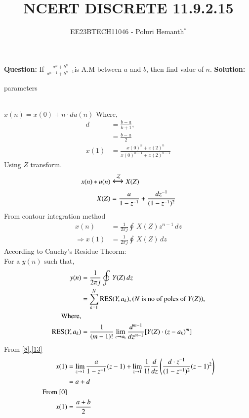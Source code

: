 \documentclass[journal,12pt,twocolumn]{IEEEtran}
\theoremstyle{remark}
\begin{document}

\vspace{3cm}


\title{NCERT DISCRETE 11.9.2.15}
\author{EE23BTECH11046 - Poluri Hemanth$^{*}$}
\maketitle
\textbf{Question:}
If \( \frac{a^n +b^n}{a^{n-1} + b^{n-1}}\)is A.M between $a$ and $b$, then find value of $n$.
\break
\textbf{Solution:}
\begin{table}[h!]
        
        \caption{parameters}
\end{table}
\\$x(n)=x(0)+n\cdot du(n)$    Where,
\begin{align}
	d&=\frac{b-a}{k+1},\\
	 &=\frac{b-a}{2}\label{0}\\
	x(1)&=\frac{x(0)^n +x(2)^n}{x(0)^{n-1} + x(2)^{n-1}}\label{r} 
\end{align}
Using $Z$ transform.
\begin{align}
	x(n)*u(n)&\Large\xleftrightarrow{\mathcal{Z}}X(Z)\\
	X(Z)&=\frac{a}{1-z^{-1}}+\frac{dz^{-1}}{(1-z^{-1})^2}\label{8}\\
\end{align}
From contour integration method
\begin{align}
	x(n)&=\frac{1}{2\pi j}\oint\,X(Z)z^{n-1}\,dz\\
	\Rightarrow x(1)&=\frac{1}{2\pi j}\oint\,X(Z)\,dz
\end{align}
According to Cauchy's Residue Theorm:\\
For a $y(n)$ such that, \\
\begin{align}
	y(n)&=\frac{1}{2\pi j}\oint\,Y(Z)\,dz\\
	&=\sum\limits_{k=1}^N\text{RES}(Y,a_k),\text{($N$ is no of poles of $Y(Z)$)},\label{13}\\ 
	\notag\text{Where,}\\
	\text{RES}(Y,a_k)&=\frac{1}{(m-1)!}\lim_{z\to a_k}\frac{d^{m-1}}{dz^{m-1}}[Y(Z)\cdot(z-a_k)^{m}]
\end{align}
From \eqref{8},\eqref{13}
\begin{align}	
	x(1)&=\lim_{z\to1}\frac{a}{1-z^{-1}}(z-1)+\lim_{z\to1}\frac{1}{1!}\frac{d}{dz}\left(\frac{d\cdot z^{-1}}{(1-z^{-1})^2}(z-1)^2\right)\\
	&=a+d\\
	\notag\text{From \eqref{0}}\\
	 x(1)&=\frac{a+b}{2}
\end{align}
\end{document}
